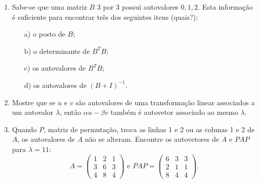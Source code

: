 \documentclass[12pt]{article}
\begin{document}
\begin{enumerate}
\item Sabe-se que uma matriz $B$ 3 por 3 possui autovalores $0,1,2$. Esta informação é suficiente para encontrar três dos seguintes itens (quais?):
  \begin{itemize}
  \item[a)] o posto de $B$;
  \item[b)] o determinante de $B^TB$;
  \item[c)] os autovalores de $B^TB$;
  \item[d)] os autovalores de $(B+I)^{-1}$.
  \end{itemize}

\item Mostre que se $u$ e $v$ são autovalores de uma transformação linear associados a um autovalor $\lambda$, então $\alpha u-\beta v$ também é autovetor associado ao mesmo $\lambda$.

\item Quando $P$, matriz de permutação, troca as linhas 1 e 2 ou as colunas 1 e 2 de $A$, os autovalores de $A$ não se alteram. Encontre os autovetores de $A$ e $PAP$ para $\lambda =11$:
  \begin{equation*}
    A = \begin{pmatrix}
        1 & 2 & 1\\
        3 & 6 & 3\\
        4 & 8 & 4
      \end{pmatrix}
      \text{ e } PAP=
      \begin{pmatrix}
        6 & 3 & 3\\
        2 & 1 & 1\\
        8 & 4 & 4
      \end{pmatrix}.
  \end{equation*}


\end{enumerate}
\end{document}
